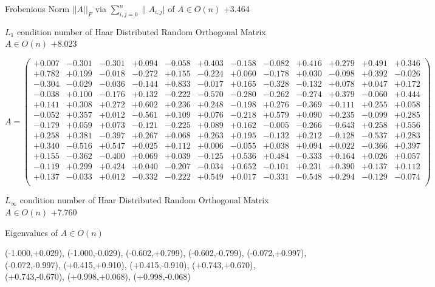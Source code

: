 \documentclass[9pt]{article}
\theoremstyle{plain}
\theoremstyle{definition}
\theoremstyle{remark}
\numberwithin{equation}{section}
\begin{document}
Frobenious Norm  $||A||_{\textit{F}}$ via $\sum\limits_{i,j =0}^{n} \|A_{i,j}|$   of  $A \in O(n)$  +3.464

$L_1$ condition number of Haar Distributed Random Orthogonal Matrix $A \in O(n)$ +8.023

$A = \left(
\begin{array}{
cccccccccccc}
+0.007 & -0.301 & -0.301 & +0.094 & -0.058 & +0.403 & -0.158 & -0.082 & +0.416 & +0.279 & +0.491 & +0.346 \\
+0.782 & +0.199 & -0.018 & -0.272 & +0.155 & -0.224 & +0.060 & -0.178 & +0.030 & -0.098 & +0.392 & -0.026 \\
-0.304 & -0.029 & -0.036 & -0.144 & +0.833 & -0.017 & +0.165 & -0.328 & -0.132 & +0.078 & +0.047 & +0.172 \\
-0.038 & +0.100 & -0.176 & +0.132 & -0.222 & -0.570 & -0.280 & -0.262 & -0.274 & +0.379 & -0.060 & +0.444 \\
+0.141 & +0.308 & +0.272 & +0.602 & +0.236 & +0.248 & -0.198 & +0.276 & -0.369 & +0.111 & +0.255 & +0.058 \\
-0.052 & +0.357 & +0.012 & -0.561 & +0.109 & +0.076 & -0.218 & +0.579 & +0.090 & +0.235 & -0.099 & +0.285 \\
-0.179 & +0.059 & +0.073 & -0.121 & -0.225 & +0.089 & +0.162 & -0.005 & -0.266 & -0.643 & +0.258 & +0.556 \\
+0.258 & +0.381 & -0.397 & +0.267 & +0.068 & +0.263 & +0.195 & -0.132 & +0.212 & -0.128 & -0.537 & +0.283 \\
+0.340 & -0.516 & +0.547 & +0.025 & +0.112 & +0.006 & -0.055 & +0.038 & +0.094 & +0.022 & -0.366 & +0.397 \\
+0.155 & -0.362 & -0.400 & +0.069 & +0.039 & -0.125 & +0.536 & +0.484 & -0.333 & +0.164 & +0.026 & +0.057 \\
-0.119 & +0.299 & +0.424 & +0.040 & -0.207 & -0.034 & +0.652 & -0.101 & +0.231 & +0.390 & +0.137 & +0.112 \\
+0.137 & -0.033 & +0.012 & -0.332 & -0.222 & +0.549 & +0.017 & -0.331 & -0.548 & +0.294 & -0.129 & -0.074 \\
\end{array}
\right)$ \newline 

$L_{\infty}$ condition number of Haar Distributed Random Orthogonal Matrix $A \in O(n)$ +7.760

Eigenvalues of $A \in O(n)$

(-1.000,+0.029), (-1.000,-0.029), (-0.602,+0.799), (-0.602,-0.799), (-0.072,+0.997), (-0.072,-0.997), (+0.415,+0.910), (+0.415,-0.910), (+0.743,+0.670), (+0.743,-0.670), (+0.998,+0.068), (+0.998,-0.068)
\end{document}
